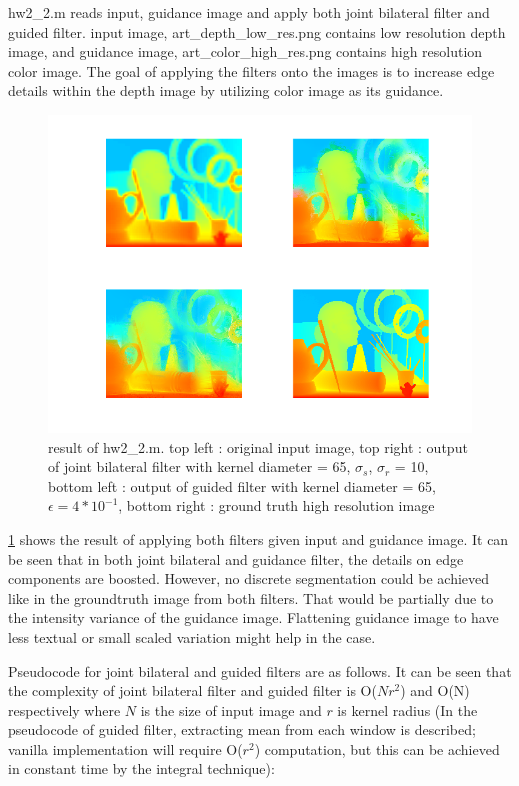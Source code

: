 \documentclass[extendedabs]{bmvc2k}
\begin{document}
hw2\_2.m reads input, guidance image and apply both joint bilateral filter and guided filter.
input image, art\_depth\_low\_res.png contains low resolution depth image, 
and guidance image, art\_color\_high\_res.png
contains high resolution color image. The goal of applying the filters onto the images
is to increase edge details within the depth image by utilizing color image as its
guidance.

\begin{figure}[h]
    \centering
    \includegraphics[width=\linewidth]{hw2_2_1}
    \caption{result of hw2\_2.m. top left : original input image,
    top right : output of joint bilateral filter with kernel diameter = 65,
    $\sigma_s$, $\sigma_r$ = 10,
    bottom left : output of guided filter with kernel diameter = 65, $\epsilon = 4*10^{-1}$,
    bottom right : ground truth high resolution image}
    \label{fig:9}
\end{figure}

\figurename{\ref{fig:9}} shows the result of applying both filters given input and guidance image.
It can be seen that in both joint bilateral and guidance filter, the details on edge components
are boosted. However, no discrete segmentation could be achieved like in the groundtruth image
from both filters. That would be partially due to the intensity variance of the guidance image.
Flattening guidance image to have less textual or small scaled variation might help in the case.

Pseudocode for joint bilateral and guided filters are as follows. It can be seen that
the complexity of joint bilateral filter and guided filter is O($Nr^2$) and O(N) respectively 
where $N$ is the size of input image and $r$ is kernel radius (In the pseudocode of guided filter,
extracting mean from each window is described; vanilla implementation will require O($r^2$) computation,
but this can be achieved in constant time by the integral technique):
\end{document}
